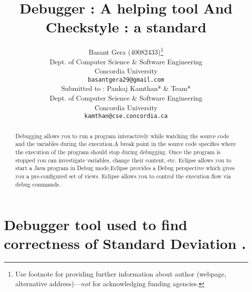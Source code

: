 \documentclass{article}
\title{Debugger : A helping tool And  Checkstyle : a standard}
\author{
  Basant Gera (40082433)\thanks{Use footnote for providing further
    information about author (webpage, alternative
    address)---\emph{not} for acknowledging funding agencies.} \\
  Dept. of Computer Science \& Software Engineering\\
  Concordia University\\
  \texttt{basantgera29@gmail.com} \\
   \And
Submitted to : Pankaj Kamthan* \& Team*\\
   Dept. of Computer Science \& Software Engineering\\
  Concordia University\\
  \texttt{kamthan@cse.concordia.ca} \\
}
\begin{document}
\maketitle

\begin{abstract}
Debugging allows you to run a program interactively while watching the source code and the variables during the execution.A break point in the source code specifies where the execution of the program should stop during debugging. Once the program is stopped you can investigate variables, change their content, etc. Eclipse allows you to start a Java program in Debug mode.Eclipse provides a Debug perspective which gives you a pre-configured set of views. Eclipse allows you to control the execution flow via debug commands.
\end{abstract}

\section{Debugger tool used to find correctness of Standard Deviation .}
\end{document}
